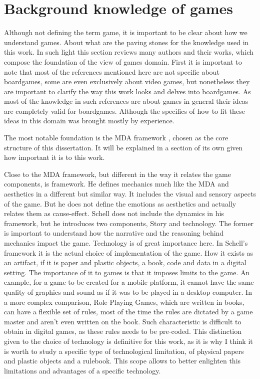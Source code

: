 \section{Background knowledge of games}

Although not defining the term game, it is important to be clear about how we understand games. About what are the paving stones for the knowledge used in this work. In such light this section reviews many authors and their works, which compose the foundation of the view of games domain. First it is important to note that most of the references mentioned here are not specific about boardgames, some are even exclusively about video games, but nonetheless they are important to clarify the way this work looks and delves into boardgames. As most of the knowledge in such references are about games in general their ideas are completely valid for boardgames. Although the specifics of how to fit these ideas in this domain was brought mostly by experience.

The most notable foundation is the MDA framework \cite{Hunicke2004}, chosen as the core structure of this dissertation. It will be explained in a section of its own given how important it is to this work.

Close to the MDA framework, but different in the way it relates the game components, is \cite{schell2014art} framework. He defines mechanics much like the MDA and aesthetics in a different but similar way. It includes the visual and sensory aspects of the game. But he does not define the emotions as aesthetics and actually relates them as cause-effect. Schell does not include the dynamics in his framework, but he introduces two components, Story and technology. The former is important to understand how the narrative and the reasoning behind mechanics impact the game. Technology is of great importance here. In Schell's framework it is the actual choice of implementation of the game. How it exists as an artifact, if it is paper and plastic objects, a book, code and data in a digital setting. The importance of it to games is that it imposes limits to the game. An example, for a game to be created for a mobile platform, it cannot have the same quality of graphics and sound as if it was to be played in a desktop computer. In a more complex comparison, Role Playing Games, which are written in books, can have a flexible set of rules, most of the time the rules are dictated by a game master and aren't even written on the book. Such characteristic is difficult to obtain in digital games, as these rules needs to be pre-coded. This distinction given to the choice of technology is definitive for this work, as it is why I think it is worth to study a specific type of technological limitation, of physical papers and plastic objects and a rulebook. This scope allows to better enlighten this limitations and advantages of a specific technology.

